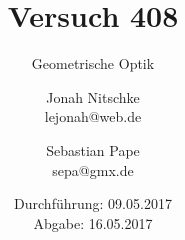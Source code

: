 

\title{Versuch 408}
\subtitle{Geometrische Optik}
\author{Jonah Nitschke\\
        lejonah@web.de \and
        Sebastian Pape\\
        sepa@gmx.de}
\date{Durchführung: 09.05.2017\\
      Abgabe: 16.05.2017}



\maketitle
\newpage
\setcounter{page}{1}




\newpage
\printbibliography


